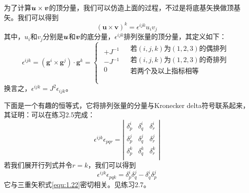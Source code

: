 为了计算$\boldsymbol{u}\times \boldsymbol{v}$的顶分量，我们可以仿造上面的过程，不过是将底基矢换做顶基矢。我们可以得到
\begin{equation}\label{equ:2.15}
    \left( \boldsymbol{u}\times \boldsymbol{v} \right) ^k=\epsilon ^{ijk}u_iv_j
\end{equation}
其中，$u_{i}$和$v_{j}$分别是$\boldsymbol{u}$和$\boldsymbol{v}$的底分量，$\epsilon^{ijk}$排列张量的顶分量，其定义如下：
\begin{equation}\label{equ:2.16}
    \epsilon ^{ijk}=\left( \boldsymbol{g}^i\times \boldsymbol{g}^j \right) \cdot \boldsymbol{g}^k=\left\{ \begin{matrix}
        \begin{array}{c}
        +J^{-1}\\
        -J^{-1}\\
        0\\
    \end{array}&		\begin{array}{l}
        \text{若}\left( i,j,k \right) \text{为}\left( 1,2,3 \right) \text{的偶排列}\\
        \text{若}\left( i,j,k \right) \text{为}\left( 1,2,3 \right) \text{的奇排列}\\
        \text{若两个及以上指标相等}\\
    \end{array}\\
    \end{matrix} \right.  
\end{equation}
换言之，$\epsilon ^{ijk}=J^2\epsilon _{ijk}$。

下面是一个有趣的恒等式，它将排列张量的分量与Kronecker delta符号联系起来，其证明：可以在练习2.5完成：
\begin{equation}\label{equ:2.17}
    \epsilon ^{ijk}\epsilon _{pqr}=\left| \begin{matrix}
        \delta _{p}^{i}&		\delta _{q}^{i}&		\delta _{r}^{i}\\
        \delta _{p}^{j}&		\delta _{q}^{j}&		\delta _{r}^{j}\\
        \delta _{p}^{k}&		\delta _{q}^{k}&		\delta _{r}^{k}\\
    \end{matrix} \right|
\end{equation}
若我们展开行列式并令$r=k$，我们可以得到
\begin{equation}\label{equ:2.18}
    \epsilon ^{ijk}\epsilon _{pqk}=\delta _{p}^{i}\delta _{q}^{j}-\delta _{q}^{i}\delta _{p}^{j}
\end{equation}
它与三重矢积式\eqref{equ:1.22}密切相关。见练习2.7。